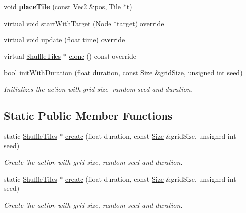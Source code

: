 \begin{DoxyCompactItemize}
\item 
\mbox{\label{classShuffleTiles_a79541397bcf2dea69515f3919cc7b48d}} 
void {\bfseries place\+Tile} (const \hyperlink{classVec2}{Vec2} \&pos, \hyperlink{structTile}{Tile} $\ast$t)
\item 
virtual void \hyperlink{classShuffleTiles_af9880bf4abd44f5b605ab1a47159e817}{start\+With\+Target} (\hyperlink{classNode}{Node} $\ast$target) override
\item 
virtual void \hyperlink{classShuffleTiles_a1f767f97531089a4ae73dd4c54741b01}{update} (float time) override
\item 
virtual \hyperlink{classShuffleTiles}{Shuffle\+Tiles} $\ast$ \hyperlink{classShuffleTiles_a77da891a86963aa76948363caa58dd52}{clone} () const override
\item 
bool \hyperlink{classShuffleTiles_a7050f01cdfb27989f37117cad08dfa70}{init\+With\+Duration} (float duration, const \hyperlink{classSize}{Size} \&grid\+Size, unsigned int seed)
\begin{DoxyCompactList}\small\item\em Initializes the action with grid size, random seed and duration. \end{DoxyCompactList}\end{DoxyCompactItemize}
\subsection*{Static Public Member Functions}
\begin{DoxyCompactItemize}
\item 
static \hyperlink{classShuffleTiles}{Shuffle\+Tiles} $\ast$ \hyperlink{classShuffleTiles_a3e798976a59c3991a6e1445d7ad31d39}{create} (float duration, const \hyperlink{classSize}{Size} \&grid\+Size, unsigned int seed)
\begin{DoxyCompactList}\small\item\em Create the action with grid size, random seed and duration. \end{DoxyCompactList}\item 
static \hyperlink{classShuffleTiles}{Shuffle\+Tiles} $\ast$ \hyperlink{classShuffleTiles_ab7033e9b7df54eb203588b793dc9859b}{create} (float duration, const \hyperlink{classSize}{Size} \&grid\+Size, unsigned int seed)
\begin{DoxyCompactList}\small\item\em Create the action with grid size, random seed and duration. \end{DoxyCompactList}\end{DoxyCompactItemize}
